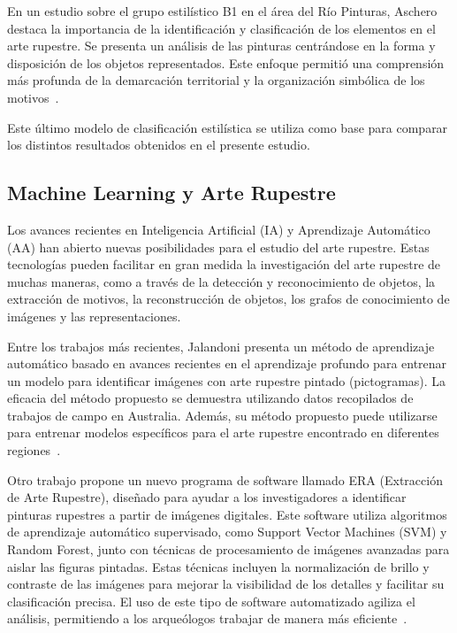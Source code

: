 En un estudio sobre el grupo estilístico B1 en el área del Río Pinturas, Aschero destaca la importancia de la identificación y clasificación de los elementos en el arte rupestre. Se presenta un análisis de las pinturas centrándose en la forma y disposición de los objetos representados. Este enfoque permitió una comprensión más profunda de la demarcación territorial y la organización simbólica de los motivos~\cite{aschero2018b}.

Este último modelo de clasificación estilística se utiliza como base para comparar los distintos resultados obtenidos en el presente estudio.

\subsection{Machine Learning y Arte Rupestre}

\sloppy
Los avances recientes en Inteligencia Artificial (IA) y Aprendizaje Automático (AA) han abierto nuevas posibilidades para el estudio del arte rupestre. Estas tecnologías pueden facilitar en gran medida la investigación del arte rupestre de muchas maneras, como a través de la detección y reconocimiento de objetos, la extracción de motivos, la reconstrucción de objetos, los grafos de conocimiento de imágenes y las representaciones.

Entre los trabajos más recientes, Jalandoni presenta un método de aprendizaje automático basado en avances recientes en el aprendizaje profundo para entrenar un modelo para identificar imágenes con arte rupestre pintado (pictogramas). La eficacia del método propuesto se demuestra utilizando datos recopilados de trabajos de campo en Australia. Además, su método propuesto puede utilizarse para entrenar modelos específicos para el arte rupestre encontrado en diferentes regiones~\cite{jalandoni2022}.

Otro trabajo propone un nuevo programa de software llamado ERA (Extracción de Arte Rupestre), diseñado para ayudar a los investigadores a identificar pinturas rupestres a partir de imágenes digitales. Este software utiliza algoritmos de aprendizaje automático supervisado, como Support Vector Machines (SVM) y Random Forest, junto con técnicas de procesamiento de imágenes avanzadas para aislar las figuras pintadas. Estas técnicas incluyen la normalización de brillo y contraste de las imágenes para mejorar la visibilidad de los detalles y facilitar su clasificación precisa. El uso de este tipo de software automatizado agiliza el análisis, permitiendo a los arqueólogos trabajar de manera más eficiente~\cite{monna2022}.

